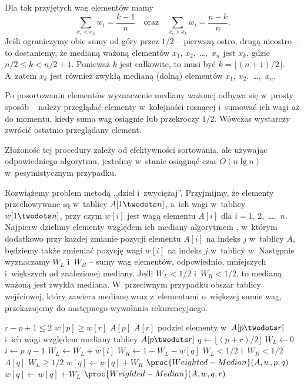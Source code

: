 \subproblem %
Dla tak przyjętych wag elementów mamy
\[
	\sum_{x_i<x_k}w_i = \frac{k-1}{n} \quad\text{oraz}\quad \sum_{x_i>x_k}w_i = \frac{n-k}{n}.
\]
Jeśli ograniczymy obie sumy od góry przez $1/2$ -- pierwszą ostro, drugą nieostro -- to dostaniemy, że medianą ważoną elementów $x_1$, $x_2$,~\dots,~$x_n$ jest $x_k$, gdzie $n/2\le k<n/2+1$.
Ponieważ $k$ jest całkowite, to musi być $k=\lfloor(n+1)/2\rfloor$.
A~zatem $x_k$ jest również zwykłą medianą (dolną) elementów $x_1$, $x_2$,~\dots,~$x_n$.

\subproblem %
Po posortowaniu elementów wyznaczenie mediany ważonej odbywa się w~prosty sposób -- należy przeglądać elementy w~kolejności rosnącej i~sumować ich wagi aż do momentu, kiedy suma wag osiągnie lub przekroczy $1/2$.
Wówczas wystarczy zwrócić ostatnio przeglądany element.

Złożoność tej procedury zależy od efektywności sortowania, ale używając odpowiedniego algorytmu, jesteśmy w~stanie osiągnąć czas $O(n\lg n)$ w~pesymistycznym przypadku.

\subproblem %
Rozwiążemy problem metodą ,,dziel i~zwyciężaj''.
Przyjmijmy, że elementy przechowywane są w~tablicy $A[1\twodots n]$, a~ich wagi w~tablicy $w[1\twodots n]$, przy czym $w[i]$ jest wagą elementu $A[i]$ dla $i=1$, 2,~\dots,~$n$.
Najpierw dzielimy elementy względem ich mediany algorytmem , w~którym dodatkowo przy każdej zmianie pozycji elementu $A[i]$ na indeks $j$ w~tablicy $A$, będziemy także zmieniać pozycję wagi $w[i]$ na indeks $j$ w~tablicy $w$.
Następnie wyznaczamy $W_L$ i~$W_R$ -- sumy wag elementów, odpowiednio, mniejszych i~większych od znalezionej mediany.
Jeśli $W_L<1/2$ i~$W_R<1/2$, to medianą ważoną jest zwykła mediana.
W~przeciwnym przypadku obszar tablicy wejściowej, który zawiera medianę wraz z~elementami o~większej sumie wag, przekazujemy do następnego wywołania rekurencyjnego.
\begin{codebox}
\li	\If $r-p+1\le2$ \label{li:weighted-median-boundary-case-begin}
\li		\Then
			\If $w[p]\ge w[r]$
\li				\Then \Return $A[p]$
\li				\Else \Return $A[r]$
				\End \label{li:weighted-median-boundary-case-end}
		\End
\li	podziel elementy w~$A[p\twodots r]$ i~ich wagi względem mediany tablicy $A[p\twodots r]$ \label{li:weighted-median-partition}
\li	$q\gets\lfloor(p+r)/2\rfloor$
\li	$W_L\gets0$
\li	\For $i\gets p$ \To $q-1$
\li		\Do $W_L\gets W_L+w[i]$
		\End
\li	$W_R\gets1-W_L-w[q]$
\li	\If $W_L<1/2$ i~$W_R<1/2$
\li		\Then \Return $A[q]$
		\End
\li	\If $W_L\ge1/2$
\li		\Then
			$w[q]\gets w[q]+W_R$
\li			\Return $\proc{Weighted-Median}(A,w,p,q)$
\li		\Else
			$w[q]\gets w[q]+W_L$
\li			\Return $\proc{Weighted-Median}(A,w,q,r)$
		\End
\end{codebox}

